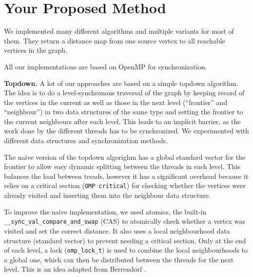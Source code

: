 \documentclass[letterpaper]{article}
\newcommand{\mypar}[1]{{\bf #1.}} %
\begin{document}
	\section{Your Proposed Method}\label{sec:yourmethod}
	
	
	We implemented many different algorithms and multiple variants for most of them. They return a distance map from one source vertex to all reachable vertices in the graph.
	
	All our implementations are based on OpenMP for synchronization.
	
	
	\mypar{Topdown}
	A lot of our approaches are based on a simple topdown algorithm. The idea is to do a level-synchronous traversal of the graph by keeping record of the vertices in the current as well as those in the next level (``frontier'' and ``neighbour'') in two data structures of the same type and setting the frontier to the current neighbours after each level. This leads to an implicit barrier, as the work done by the different threads has to be synchronized. We experimented with different data structures and synchronization methods.
	
	The naive version of the topdown algorighm has a global standard vector for the frontier to allow easy dynamic splitting between the threads in each level. This balances the load between treads, however it has a significant overhead because it relies on a critical section (\verb+OMP critical+) for checking whether the vertices were already visited and inserting them into the neighbour data structure.
	
	To improve the naive implementation, we used atomics, the built-in \verb+__sync_val_compare_and_swap+ (CAS) to atomically check whether a vertex was visited and set the correct distance. It also uses a local neighbourhood data structure (standard vector) to prevent needing a critical section. Only at the end of each level, a lock (\verb+omp_lock_t+) is used to combine the local neighbourhoods to a global one, which can then be distributed between the threads for the next level. This is an idea adapted from Berrendorf \cite{Berrendorf:14}.
	
\end{document}
